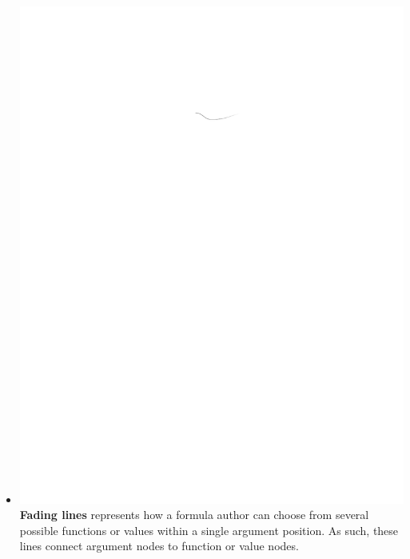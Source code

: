 \documentclass[conference]{IEEEtran}
\begin{document}
\begin{itemize}
		\item  \vspace{.15cm} \includegraphics{glossary-fadingline} \textbf{Fading
			lines} represents how a formula author can choose from several possible
		functions or values within a single argument position. As such, these lines
		connect argument nodes to function or value nodes.
		

\end{itemize}
\end{document}
